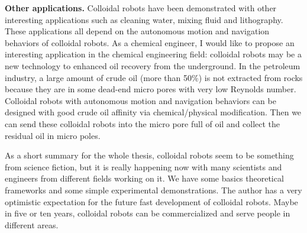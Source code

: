 \textbf{Other applications.} Colloidal robots have been demonstrated with other interesting applications such as cleaning water, mixing fluid and lithography\autocite{soler2014catalytic,fei2019magneto,li2014nanomotor}. These applications all depend on the autonomous motion and navigation behaviors of colloidal robots. As a chemical engineer, I would like to propose an interesting application in the chemical engineering field: colloidal robots may be a new technology to enhanced oil recovery from the underground. In the petroleum industry, a large amount of crude oil (more than 50$\%$) is not extracted from rocks because they are in some dead-end micro pores with very low Reynolds number. Colloidal robots with autonomous motion and navigation behaviors can be designed with good crude oil affinity via chemical/physical modification. Then we can send these colloidal robots into the micro pore full of oil and collect the residual oil in micro poles.

As a short summary for the whole thesis, colloidal robots seem to be something from science fiction, but it is really happening now with many scientists and engineers from different fields working on it. We have some basics theoretical frameworks and some simple experimental demonstrations. The author has a very optimistic expectation for the future fast development of colloidal robots. Maybe in five or ten years, colloidal robots can be commercialized and serve people in different areas.  


